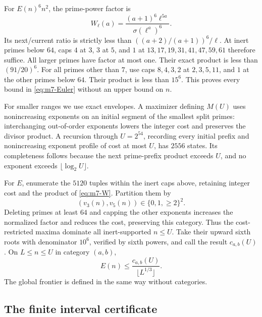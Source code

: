 For \(E(n)^6n^2\), the prime-power factor is
\begin{equation}
                  W_\ell(a)=
               \frac{(a+1)^6\ell^{5a}}{\sigma(\ell^a)^6}.       \label{eq:m7-W}
\end{equation}
Its next/current ratio is strictly less than
\(((a+2)/(a+1))^6/\ell\).
At inert primes below \(64\), caps \(4\) at \(3\), \(3\) at \(5\),
and \(1\) at \(13,17,19,31,41,47,59,61\) therefore suffice.
All larger primes have factor at most one. Their exact product
is less than \((91/20)^6\).
For all primes other than \(7\), use caps \(8,4,3,2\) at
\(2,3,5,11\), and \(1\) at the other primes below \(64\).
Their product is less than \(15^6\). This proves every bound
in \eqref{eq:m7-Euler} without an upper bound on \(n\).

For smaller ranges we use exact envelopes. A maximizer defining
\(M(U)\) uses nonincreasing exponents on an initial segment of the
smallest split primes: interchanging out-of-order exponents lowers
the integer cost and preserves the divisor product.
A recursion through \(U=2^{54}\), recording every initial prefix
and nonincreasing exponent profile of cost at most \(U\), has
\(2556\) states. Its completeness follows because the next
prime-prefix product exceeds \(U\), and no exponent exceeds
\(\lfloor\log_2U\rfloor\).

For \(E\), enumerate the \(5120\) tuples within the inert caps
above, retaining integer cost and the product of
\eqref{eq:m7-W}. Partition them by
\[
                 (v_3(n),v_5(n))\in\{0,1,\ge2\}^2.
\]
Deleting primes at least \(64\) and capping the other exponents
increases the normalized factor and reduces the cost, preserving
this category. Thus the cost-restricted maxima dominate all
inert-supported \(n\le U\). Take their upward sixth roots with
denominator \(10^6\), verified by sixth powers, and call the result
\(c_{a,b}(U)\). On \(L\le n\le U\) in category \((a,b)\),
\begin{equation}
                      E(n)\le
                  \frac{c_{a,b}(U)}{\lfloor L^{1/3}\rfloor}.    \label{eq:m7-localE}
\end{equation}
The global frontier is defined in the same way without categories.

\subsection{The finite interval certificate}

